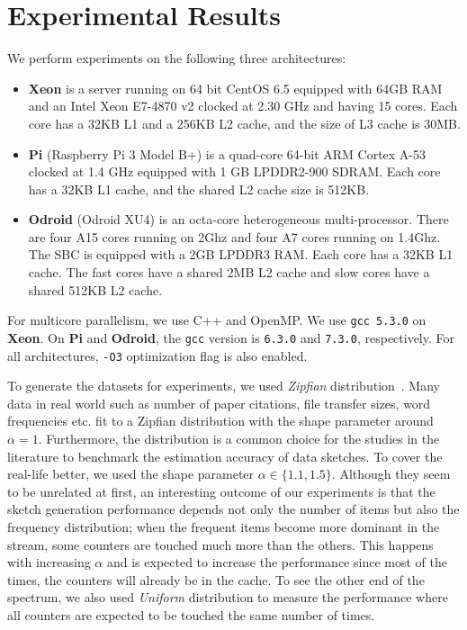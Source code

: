 \documentclass[runningheads]{llncs}
\begin{document}
\section{Experimental Results}\label{sec:exp}

We perform experiments on the following three architectures: 
\begin{itemize}[leftmargin=*]
\item {\bf Xeon} is a server running on 64 bit CentOS 6.5 equipped with 64GB RAM and an Intel Xeon E7-4870 v2 clocked at 2.30 GHz and having 15 cores. Each core has a 32KB L1 and a 256KB L2 cache, and the size of L3 cache is 30MB. 
\item {\bf Pi} (Raspberry Pi 3 Model B+) is a quad-core 64-bit ARM Cortex A-53 clocked at 1.4 GHz equipped with 1 GB LPDDR2-900 SDRAM.  Each core has a 32KB L1 cache, and the shared L2 cache size is 512KB.
\item {\bf Odroid} (Odroid XU4) is an octa-core heterogeneous multi-processor. There are four A15 cores running on 2Ghz and four A7 cores running on 1.4Ghz. The SBC is equipped with a 2GB LPDDR3 RAM. Each core has a 32KB L1 cache. The fast cores have a shared 2MB L2 cache and slow cores have a shared 512KB L2 cache. 
\end{itemize}
For  multicore parallelism, we use C++ and OpenMP. We use {\tt gcc 5.3.0} on {\bf Xeon}. On {\bf Pi} and  {\bf Odroid}, the {\tt gcc} version is {\tt 6.3.0} and {\tt 7.3.0}, respectively. For all architectures, {\tt -O3} optimization flag is also enabled.

To generate the datasets for experiments, we used {\em Zipfian} distribution~\cite{Zipf1935}. Many data in real world such as number of paper citations, file transfer sizes, word frequencies etc. fit to a Zipfian distribution with the shape parameter around $\alpha = 1$. Furthermore, the distribution is a common choice for the studies in the literature to benchmark the estimation accuracy of data sketches. To cover the real-life better, we used the shape parameter $\alpha \in \{1.1, 1.5\}$. Although they seem to be unrelated at first, an interesting outcome of our experiments is that the sketch generation performance depends not only the number of items but also the frequency distribution; when 
the frequent items become more dominant in the stream, some counters are touched much more than the others. This happens with increasing $\alpha$ and is expected to increase the performance since most of the times, the counters will already be in the cache. To see the other end of the spectrum, we also used {\em Uniform} distribution to measure the performance where all counters are expected to be touched the same number of times. 
\end{document}
